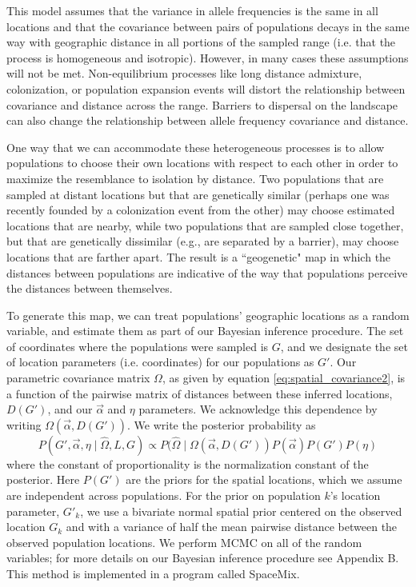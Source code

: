 \documentclass[12pt]{article}
\begin{document}
This model assumes that the variance in allele frequencies is the same in all locations and that the covariance between pairs of populations decays in the same way with geographic distance in all portions of the sampled range (i.e. that the process is homogeneous and isotropic). However, in many cases these assumptions will not be met. Non-equilibrium processes like long distance admixture, colonization, or population expansion events will  distort the relationship between covariance and distance across the range.  Barriers to dispersal on the landscape can also change the relationship between allele frequency covariance and distance.

One way that we can accommodate these heterogeneous processes is to allow populations to choose their own locations with respect to each other in order to maximize the resemblance to isolation by distance. Two populations that are sampled at distant locations but that are genetically similar (perhaps one was recently founded by a colonization event from the other) may choose estimated locations that are nearby, while two populations that are sampled close together, but that are genetically dissimilar (e.g., are separated by a barrier), may choose locations that are farther apart. The result is a ``geogenetic" map in which the distances between populations are indicative of the way that populations perceive the distances between themselves.

To generate this map, we can treat populations' geographic locations as a random variable, and estimate them as part of our Bayesian inference procedure.  The set of coordinates where the populations were sampled is $G$, and we designate the set of location parameters (i.e. coordinates) for our populations as $G'$. Our parametric covariance matrix $\Omega$, as given by equation \eqref{eq:spatial_covariance2}, is a function of the pairwise matrix of distances between these inferred locations, $D(G')$, and our $\vec{\alpha}$ and $\eta$ parameters.  We acknowledge this dependence by writing $\Omega(\vec{\alpha},{D}(G'))$.  We write the  posterior probability as 
\begin{equation}
\label{eq:cyol_prob}
P(G', \vec{\alpha}, \eta \mid \widehat{\Omega}, L,G) \propto  P(\widehat{\Omega}  \mid \Omega(\vec{\alpha},{D}(G') ) P(\vec{\alpha}) P(G') P(\eta) 
\end{equation}
where the constant of proportionality is the normalization constant of the posterior. Here $P(G') $ are the priors for the spatial locations, which we assume are independent across populations. For the prior on population $k$'s location parameter, $G'_k$, we use a bivariate normal spatial prior centered on the observed location $G_k$ and with a variance of half the mean pairwise distance between the observed population locations. We perform MCMC on all of the random variables; for more details on our Bayesian inference procedure see Appendix B. This method is implemented in a program called SpaceMix.
\end{document}
